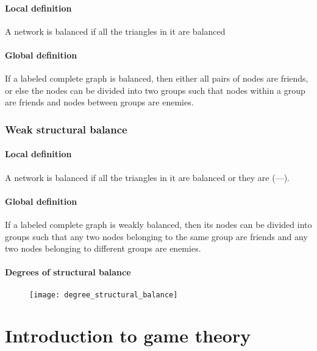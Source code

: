 \subsubsection{Local definition}

A network is balanced if all the triangles in it are balanced

\subsubsection{Global definition}

If a labeled complete graph is balanced, then either all pairs of nodes are friends, or else the nodes can be divided into two groups such that nodes within a group are friends and nodes between groups are enemies.

\subsection{Weak structural balance}

\subsubsection{Local definition}

A network is balanced if all the triangles in it are balanced or they are (---).

\subsubsection{Global definition}

If a labeled complete graph is weakly balanced, then its nodes can be divided into groups such that any two nodes belonging to the same group are friends and any two nodes belonging to different groups are enemies.

\subsubsection{Degrees of structural balance}

\begin{figure}[H]
    \centering
    \texttt{[image: degree\_structural\_balance]}
\end{figure}

\chapter{Introduction to game theory}

